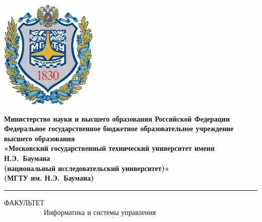 \begin{titlepage}
	\noindent\begin{minipage}{0.15\textwidth}
		\includegraphics[width=\linewidth]{img/b_logo.png}
	\end{minipage}
	\noindent\begin{minipage}{0.9\textwidth}\centering
		\textbf{Министерство науки и высшего образования Российской Федерации}\\
		\textbf{Федеральное государственное бюджетное образовательное учреждение высшего образования}\\
		\textbf{«Московский государственный технический университет имени Н.Э.~Баумана}\\
		\textbf{(национальный исследовательский университет)»}\\
		\textbf{(МГТУ им. Н.Э.~Баумана)}
	\end{minipage}

	\noindent\rule{18cm}{3pt}
	\newline
	\noindent ФАКУЛЬТЕТ $\underline{\text{~~~~~~~~~~~~~~~~~Информатика и системы управления~~~~~~~~~~~~~~~~~~~~~~~~~~~~}}$ \newline
	

\end{titlepage}
